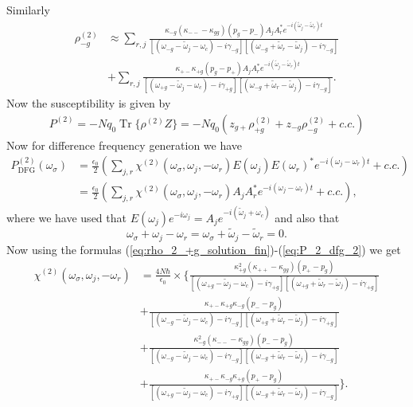 \documentclass[preprint,secnumarabic,amssymb, nobibnotes, aip, prd]{revtex4-1}
\def\tw{\tilde{\omega}}
\def\tw{\tilde{\omega}}
\DeclareMathOperator{\Tr}{Tr}
\begin{document}
	Similarly
	\begin{align}
	\label{eq:rho_2_-g_solution_fin}
	\rho_{-g}^{(2)} &\approx  \sum_{r,j} \frac{\kappa_{-g}(\kappa_{--}-\kappa_{gg})(p_g-p_-) A_j A_r^* e^{-i(\tw_j-\tw_r)t}}{[( \omega_{- g} - \tw_j-\omega_c) -i\gamma_{- g}][( \omega_{- g} +\tw_r- \tw_j) -i\gamma_{- g}]} \nonumber \\ 
	&+\sum_{r,j}\frac{\kappa_{+-}\kappa_{+g}(p_g-p_+) A_j A_r^* e^{-i(\tw_j-\tw_r)t}}{[( \omega_{+g} - \tw_j-\omega_c) -i\gamma_{+g}][( \omega_{- g} +\tw_r- \tw_j) -i\gamma_{- g}]}.
	\end{align}
	Now the susceptibility is given by 
	\begin{align}
	P^{(2)} = -Nq_0 \Tr\{\rho^{(2)} Z\} = -Nq_0 (z_{g+}\rho_{+g}^{(2)} + z_{-g}\rho_{-g}^{(2)} +c.c.) \label{eq:P_2_dfg_1}
	\end{align}
	Now for difference frequency generation we have 
	\begin{align}
	P^{(2)}_{\text{DFG}}(\omega_\sigma) &= \frac{\epsilon_0}{2} \left (\sum_{j,r} \chi^{(2)}(\omega_\sigma,\omega_j,-\omega_r) E(\omega_j)E(\omega_r)^* e^{-i(\omega_j-\omega_r)t} + c.c. \right )\nonumber \\
	&= \frac{\epsilon_0}{2}\left (\sum_{j,r} \chi^{(2)}(\omega_\sigma,\omega_j,-\omega_r) A_jA_r^* e^{-i(\omega_j-\omega_r)t} + c.c.\right ), \label{eq:P_2_dfg_2}
	\end{align}
	where we have used that $E(\omega_j)e^{-i\omega_j} = A_j e^{-i(\tw_j+\omega_c)}$ and also that $$\omega_\sigma + \omega_j-\omega_r = \omega_\sigma + \tw_j-\tw_r = 0.$$
	Now using the formulas (\ref{eq:rho_2_+g_solution_fin})-(\ref{eq:P_2_dfg_2}) we get
	\begin{align}
	\chi^{(2)}(\omega_\sigma,\omega_j,-\omega_r) &= 
	 \frac{4 N \hbar}{\epsilon_0}\times \Big \{ \frac{\kappa_{+g}^2(\kappa_{++}-\kappa_{gg})(p_+-p_g)}{[( \omega_{+ g} - \tw_j-\omega_c) -i\gamma_{+ g}][( \omega_{+ g} +\tw_r- \tw_j) -i\gamma_{+ g}]} \nonumber \\ 
   & +\frac{\kappa_{+-}\kappa_{+g}\kappa_{-g}(p_--p_g)}{[( \omega_{-g} - \tw_j-\omega_c) -i\gamma_{-g}][( \omega_{+ g} +\tw_r- \tw_j) -i\gamma_{+ g}]} \nonumber \\
    &+ \frac{\kappa_{-g}^2(\kappa_{--}-\kappa_{gg})(p_--p_g)}{[( \omega_{- g} - \tw_j-\omega_c) -i\gamma_{- g}][( \omega_{- g} +\tw_r- \tw_j) -i\gamma_{- g}]} \nonumber \\ 
    &+\frac{\kappa_{+-}\kappa_{-g}\kappa_{+g}(p_+-p_g)}{[( \omega_{+g} - \tw_j-\omega_c) -i\gamma_{+g}][( \omega_{- g} +\tw_r- \tw_j) -i\gamma_{- g}]}  \Big \}.
	\end{align}
	\newpage
\end{document}
